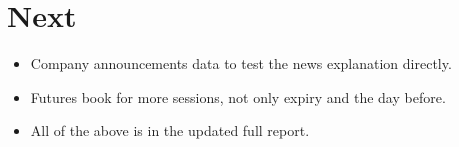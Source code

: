 \documentclass[11pt]{article}
\begin{document}
\section*{Next}
\begin{itemize}
  \item Company announcements data to test the news explanation directly.
  \item Futures book for more sessions, not only expiry and the day before.
  \item All of the above is in the updated full report.
\end{itemize}
\end{document}
